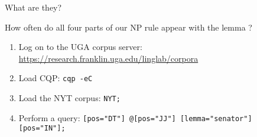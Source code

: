 \documentclass{beamer}
\newcommand{\subtwoone}{What are they?}
\begin{document}
\begin{frame}[t]{\subtwoone}
{\begin{block}{How often do all four parts of our NP rule appear with the lemma ?}
\begin{enumerate}
              \item Log on to the UGA corpus server: \url{https://research.franklin.uga.edu/linglab/corpora}
              \item Load CQP: \texttt{cqp -eC}
              \item Load the NYT corpus: \texttt{NYT;}
              \item Perform a query: \texttt{[pos="DT"] @[pos="JJ"] [lemma="senator"] [pos="IN"];}
            \end{enumerate}
          \end{block}
        }
      \end{frame}
\end{document}
